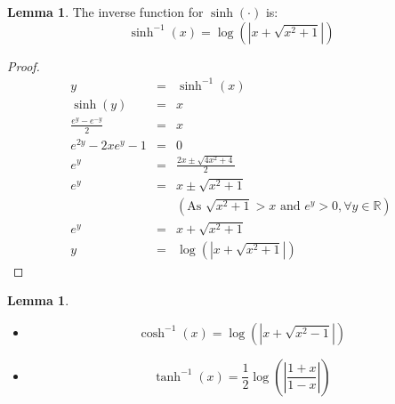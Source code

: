 \documentclass[11pt]{article}
\theoremstyle{definition}
\newtheorem{lemma}[prop]{Lemma}
\newcommand{\brac}[1]{\left(#1\right)}
\newcommand{\abs}[1]{\left\lvert#1\right\rvert}
\newcommand{\R}{\mathbb{R}}
\begin{document}
	\begin{lemma}
		The inverse function for $\sinh\brac{\cdot}$ is:
		$$ \sinh^{-1}\brac{x} = \log\brac{\abs{x+\sqrt{x ^2 +1}}}$$
	\end{lemma}
	\begin{proof}
		\begin{eqnarray*}
			y &=& \sinh^{-1}\brac{x}\\
			\sinh\brac{y} &=& x \\
			\frac{e^y-e^{-y}}{2} &=& x\\
			e^{2y} -2xe^y -1 &=& 0\\
			e^y &=& \frac{2x\pm \sqrt{4x^2+4}}{2}\\
			e^y &=& x \pm \sqrt{x^2 + 1}\\
		&&	(\text{As } \sqrt{x^2 + 1} > x \text{ and } e^y>0,  \forall y \in \R)\\
			e^y &=& x + \sqrt{x^2 + 1}\\
			y &=& \log\brac{\abs{x+\sqrt{x^2 + 1}}}
		\end{eqnarray*}
	\end{proof}
	\begin{lemma}
		\begin{itemize}
			\item $$\cosh^{-1}\brac{x} = \log\brac{\abs{x+\sqrt{x^2 -1}}}$$
			\item $$\tanh^{-1}\brac{x} = \frac{1}{2}\log\brac{\abs{\frac{1+x}{1-x}}}$$
		\end{itemize}
	\end{lemma}
\end{document}
